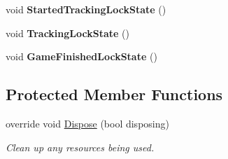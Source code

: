 \begin{DoxyCompactItemize}
void {\bfseries Started\+Tracking\+Lock\+State} ()
\item 
\mbox{\label{class_chess_tracking_1_1_user_interface_1_1_main_game_form_aa53e6eac8db9a3642d321db2ac2318cf}} 
void {\bfseries Tracking\+Lock\+State} ()
\item 
\mbox{\label{class_chess_tracking_1_1_user_interface_1_1_main_game_form_a720f2c3d6da9305cf8035addac58f4fc}} 
void {\bfseries Game\+Finished\+Lock\+State} ()
\end{DoxyCompactItemize}
\subsection*{Protected Member Functions}
\begin{DoxyCompactItemize}
\item 
override void \mbox{\hyperlink{class_chess_tracking_1_1_user_interface_1_1_main_game_form_a3bf6a16a27b629ec6eed0caab59a93de}{Dispose}} (bool disposing)
\begin{DoxyCompactList}\small\item\em Clean up any resources being used. \end{DoxyCompactList}\end{DoxyCompactItemize}
